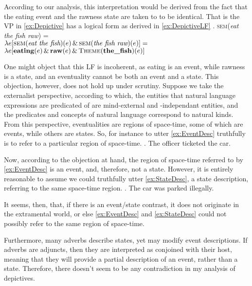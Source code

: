 \documentclass[MilwayThesis]{subfiles}
\begin{document}
According to our analysis, this interpretation would be derived from the fact that the eating event and the rawness state are taken to to be identical.
That is the VP in \cref{ex:Depictive} has a logical form  as derived in \cref{ex:DepictiveLF}
\ex. \textsc{sem}(\textit{eat the fish raw}) =\\
$\lambda e [\textsc{sem}(\textit{eat the fish})(e) \, \&\, \textsc{sem}(\textit{the fish raw})(e)] =$\\
$\lambda e [\textbf{eating}(e)\, \&\, \textbf{raw}(e)\, \&\, \textsc{Theme}(\textbf{the\_fish})(e)]$\label{ex:DepictiveLF}

One might object that this LF is incoherent, as eating is an event, while rawness is a state, and an eventuality cannot be both an event and a state.
This objection, however, does not hold up under scrutiny.
Suppose we take the externalist perspective, according to which, the entities that natural language expressions are predicated of are mind-external and -independant entities, and the predicates and concepts of natural language correspond to natural kinds.
From this perspective, eventualities are regions of space-time, some of which are events, while others are states.
So, for instance to utter \cref{ex:EventDesc} truthfully is to refer to a particular region of space-time.
\ex.\label{ex:EventDesc} The officer ticketed the car.

Now, according to the objection at hand, the region of space-time referred to by \cref{ex:EventDesc} is an event, and, therefore, not a state.
However, it is entirely reasonable to assume we could truthfully utter \cref{ex:StateDesc}, a state description, referring to the same space-time region.
\ex.\label{ex:StateDesc} The car was parked illegally.

It seems, then, that, if there is an event/state contrast, it does not originate in the extramental world, or else \cref{ex:EventDesc} and \cref{ex:StateDesc} could not possibly refer to the same region of space-time.

Furthermore, many adverbs describe states, yet may modify event descriptions.
If adverbs are adjuncts, then they are interpreted as conjoined with their host, meaning that they will provide a partial description of an event, rather than a state.
Therefore, there doesn't seem to be any contradiction in my analysis of depictives.
\end{document}
